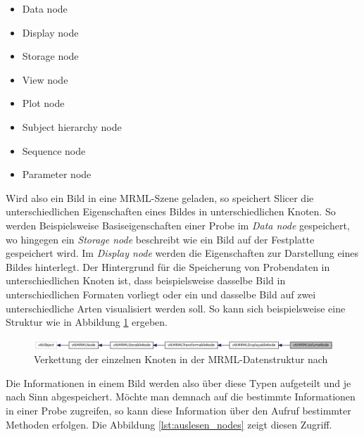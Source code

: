 \begin{minipage}{0.45\textwidth}
	\begin{itemize}
		\item Data node

		\item Display node

		\item Storage node

		\item View node
	\end{itemize}
\end{minipage}
\hfill
\begin{minipage}{0.45\textwidth}
	\begin{itemize}
		\item Plot node

		\item Subject hierarchy node

		\item Sequence node

		\item Parameter node
	\end{itemize}
\end{minipage}

Wird also ein Bild in eine \ac{MRML}-Szene geladen, so speichert Slicer die
unterschiedlichen Eigenschaften eines Bildes in unterschiedlichen Knoten. So werden
Beispielsweise Basiseigenschaften einer Probe im \textit{Data node} gespeichert,
wo hingegen ein \textit{Storage node} beschreibt wie ein Bild auf der Festplatte
gespeichert wird. Im \textit{Display node} werden die Eigenschaften zur
Darstellung eines Bildes hinterlegt. Der Hintergrund für die Speicherung von Probendaten
in unterschiedlichen Knoten ist, dass beispielsweise dasselbe Bild in
unterschiedlichen Formaten vorliegt oder ein und dasselbe Bild auf zwei
unterschiedliche Arten visualisiert werden soll. So kann sich beispielsweise eine
Struktur wie in Abbildung \ref{fig:3d_slicer_class} ergeben.

\begin{figure}[h]
	\centering
	\includegraphics[width=1\textwidth]{img/slicer_class_index.jpg}
	\caption{Verkettung der einzelnen Knoten in der MRML-Datenstruktur nach \citet{slicer2024}}
	\label{fig:3d_slicer_class}
\end{figure}

Die Informationen in einem Bild werden also über diese Typen aufgeteilt und je
nach Sinn abgespeichert. Möchte man demnach auf die bestimmte Informationen in einer
Probe zugreifen, so kann diese Information über den Aufruf bestimmter Methoden
erfolgen. Die Abbildung \ref{lst:auslesen_nodes} zeigt diesen Zugriff.


